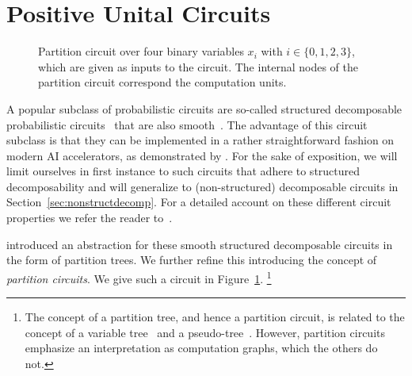 





















\section{Positive Unital Circuits}
\label{sec:puncs}

\begin{figure}[t]

	\centering
	

	\caption{
		Partition circuit over four binary variables $x_i$ with $i \in \{0,1,2,3\}$, which are given as inputs to the circuit. The internal nodes of the partition circuit correspond the computation units.}
	\label{fig:circuit}
\end{figure}


A popular subclass of probabilistic circuits are so-called structured decomposable  probabilistic circuits~\citep{darwiche2011sdd} that are also smooth~\citep{darwiche2001tractable}. The advantage of this circuit subclass is that they can be implemented in a rather straightforward fashion on modern AI accelerators, as demonstrated by \citet{peharz2019random,peharz2020einsum}.
For the sake of exposition, we will limit ourselves in first instance to such circuits that adhere to structured decomposability and will generalize to (non-structured) decomposable circuits in Section~\ref{sec:nonstructdecomp}. For a detailed account on these different circuit properties we refer the reader to~\citep{vergari2021compositional}.

\citet{zuidberg2024probabilistic} introduced an abstraction for these smooth structured decomposable circuits in the form of partition trees. We further refine this introducing the concept of \textit{partition circuits}.
We give such a circuit in Figure~\ref{fig:circuit}.
\footnote{The concept of a partition tree, and hence a partition circuit, is related to the concept of a variable tree~\citep{pipatsrisawat2008new} and a pseudo-tree~\citep{dechter2007and}. However, partition circuits emphasize an interpretation as computation graphs, which the others do not.}

